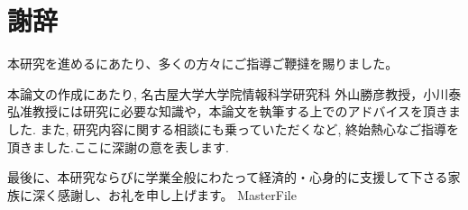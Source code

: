 \documentclass[a4j,twoside,12pt]{thesis} %
\begin{document}
\setlength{\baselineskip}{1.95zw}
\setlength{\textheight}{29\baselineskip}

\addtocounter{chapter}{+5}
\backmatter
\fi



\chapter{謝辞}
\label{chapter:acknowledgement}
本研究を進めるにあたり、多くの方々にご指導ご鞭撻を賜りました。\par
本論文の作成にあたり, 名古屋大学大学院情報科学研究科 外山勝彦教授，小川泰弘准教授には研究に必要な知識や，本論文を執筆する上でのアドバイスを頂きました. また, 研究内容に関する相談にも乗っていただくなど, 終始熱心なご指導を頂きました.ここに深謝の意を表します.\par
最後に、本研究ならびに学業全般にわたって経済的・心身的に支援して下さる家族に深く感謝し、お礼を申し上げます。
\expandafter\ifx\csname MasterFile\endcsname\relax
\end{document}
